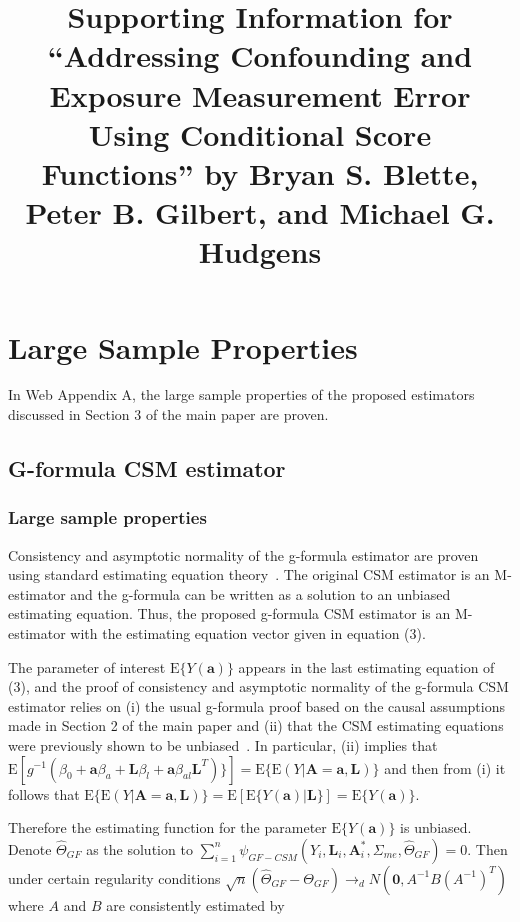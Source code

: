 \documentclass[12pt]{article}
\title{Supporting Information for ``Addressing Confounding and Exposure Measurement Error Using Conditional Score Functions'' by Bryan S. Blette, Peter B. Gilbert, and Michael G. Hudgens}
\date{}
\begin{document}


\maketitle

\section{Large Sample Properties}

In Web Appendix A, the large sample properties of the proposed estimators discussed in Section 3 of the main paper are proven.

\subsection{G-formula CSM estimator}

\subsubsection{Large sample properties}

Consistency and asymptotic normality of the g-formula estimator are proven using standard estimating equation theory~\citep{stefanski2002}. The original CSM estimator is an M-estimator and the g-formula can be written as a solution to an unbiased estimating equation. Thus, the proposed g-formula CSM estimator is an M-estimator with the estimating equation vector given in equation (3).

The parameter of interest $\text{E} \{ Y(\bm{a}) \}$ appears in the last estimating equation of (3), and the proof of consistency and asymptotic normality of the g-formula CSM estimator relies on (i) the usual g-formula proof based on the causal assumptions made in Section 2 of the main paper and (ii) that the CSM estimating equations were previously shown to be unbiased~\citep{carroll2006}. In particular, (ii) implies that $\text{E}[g^{-1}(\beta_{0} + \bm{a}\beta_{a} + \bm{L}\beta_{l} + \bm{a}\beta_{al}\bm{L}^{T}) \}] = \text{E} \{ \text{E}(Y | \bm{A} = \bm{a}, \bm{L}) \}$ and then from (i) it follows that $\text{E} \{ \text{E}(Y | \bm{A} = \bm{a}, \bm{L}) \} = \text{E}[\text{E} \{ Y(\bm{a}) | \bm{L} \}] = \text{E} \{ Y(\bm{a}) \}$.

Therefore the estimating function for the parameter $\text{E} \{ Y(\bm{a}) \}$ is unbiased. Denote $\hat{\Theta}_{GF}$ as the solution to $\sum_{i=1}^{n} \psi_{GF-CSM}(Y_{i}, \bm{L}_{i}, \bm{A}^{*}_{i}, \Sigma_{me}, \hat{\Theta}_{GF}) = 0$. Then under certain regularity conditions $\sqrt{n}(\hat{\Theta}_{GF} - \Theta_{GF}) \rightarrow_{d} N(\textbf{0}, A^{-1}B(A^{-1})^{T})$ where $A$ and $B$ are consistently estimated by
\end{document}
